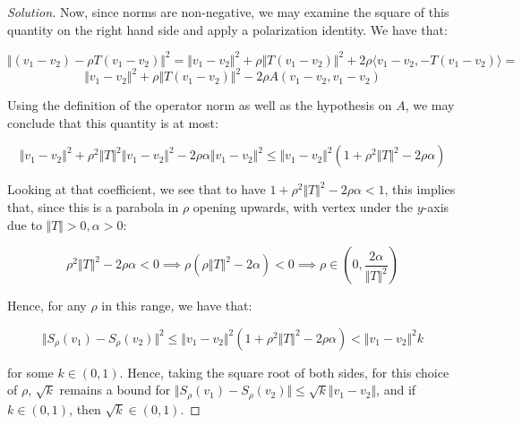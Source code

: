 \documentclass[10pt]{article}
\begin{document}
\begin{proof}[Solution]





Now, since norms are non-negative, we may examine the square of this quantity on the right hand side and apply a polarization identity. We have that:

$$  \Vert (v_1  - v_2) - \rho T(v_1 - v_2) \Vert^2 = \Vert v_1 - v_2 \Vert^2 + \rho \Vert T(v_1 - v_2) \Vert^2 + 2\rho \langle v_1 - v_2, -T(v_1 - v_2) \rangle =$$
$$ \Vert v_1 - v_2 \Vert^2 + \rho \Vert T(v_1 - v_2) \Vert^2 - 2\rho A(v_1 - v_2, v_1 - v_2) $$ 

Using the definition of the operator norm as well as the hypothesis on $A$, we may conclude that this quantity is at most:

$$ \Vert v_1 - v_2 \Vert^2 + \rho^2 \Vert T\Vert^2 \Vert v_1 - v_2 \Vert^2 - 2 \rho \alpha \Vert v_1 - v_2 \Vert^2 \leq \Vert v_1 - v_2 \Vert^2 ( 1 + \rho^2 \Vert T\Vert^2 - 2 \rho \alpha) $$

Looking at that coefficient, we see that to have $ 1 + \rho^2 \Vert T\Vert^2 - 2 \rho \alpha < 1$, this implies that, since this is a parabola in $\rho$ opening upwards, with vertex under the $y$-axis due to $\Vert T \Vert > 0, \alpha > 0$:

$$ \rho^2 \Vert T\Vert^2 - 2 \rho \alpha < 0 \implies \rho(\rho \Vert T \Vert^2 - 2 \alpha) < 0 \implies \rho \in \left( 0, \frac{ 2\alpha}{\Vert T\Vert^2}\right)$$

Hence, for any $\rho$ in this range, we have that:

$$  \Vert S_\rho(v_1) - S_\rho(v_2) \Vert^2 \leq \Vert v_1 - v_2 \Vert^2 ( 1 + \rho^2 \Vert T\Vert^2 - 2 \rho \alpha) < \Vert v_1 - v_2 \Vert^2  k $$

for some $k \in (0,1)$. Hence, taking the square root of both sides, for this choice of $\rho$, $\sqrt{k}$ remains a bound for $\Vert  S_\rho(v_1) - S_\rho(v_2) \Vert \leq \sqrt{k} \Vert v_1 - v_2 \Vert$, and if $k \in (0,1)$, then $\sqrt{k} \in (0,1)$. 


\end{proof}
\end{document}
